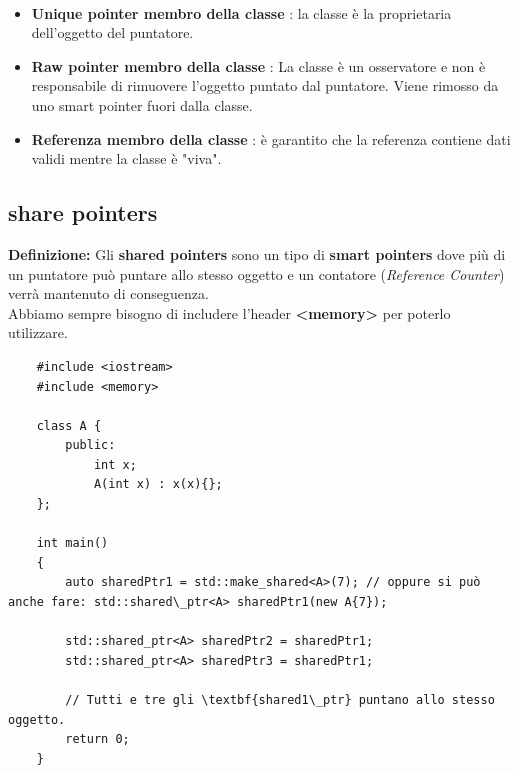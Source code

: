 \textsf{\small } \\

\begin{itemize}
	\item \textsf{\small \textbf{Unique pointer membro della classe} : la classe è la proprietaria dell'oggetto del puntatore.}
	\item \textsf{\small \textbf{Raw pointer membro della classe} : La classe è un osservatore e non è responsabile di rimuovere l'oggetto puntato dal puntatore. Viene rimosso da uno smart pointer fuori dalla classe.}
	\item \textsf{\small \textbf{Referenza membro della classe} : è garantito che la referenza contiene dati validi mentre la classe è "viva".}
\end{itemize}

\subsection{share pointers}

\textsf{\small \textbf{Definizione: } Gli \textbf{shared pointers} sono un tipo di \textbf{smart pointers} dove più di un puntatore può puntare allo stesso oggetto e un contatore (\emph{Reference Counter}) verrà mantenuto di conseguenza.} \\

\textsf{\small Abbiamo sempre bisogno di includere l'header \textbf{<memory>} per poterlo utilizzare.} \break

\begin{lstlisting}
	#include <iostream>
	#include <memory>
	
	class A {
		public:
			int x;
			A(int x) : x(x){};
	};

	int main()
	{
		auto sharedPtr1 = std::make_shared<A>(7); // oppure si può anche fare: std::shared\_ptr<A> sharedPtr1(new A{7});
		
		std::shared_ptr<A> sharedPtr2 = sharedPtr1;
		std::shared_ptr<A> sharedPtr3 = sharedPtr1;
		
		// Tutti e tre gli \textbf{shared1\_ptr} puntano allo stesso oggetto.
		return 0;
	}
\end{lstlisting}

